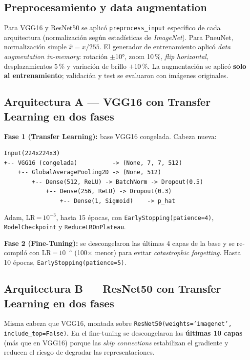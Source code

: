 \documentclass[1p,12pt]{elsarticle}
\begin{document}
\subsection{Preprocesamiento y data augmentation}

Para VGG16 y ResNet50 se aplicó \texttt{preprocess\_input} específico de cada arquitectura (normalización según estadísticas de \textit{ImageNet}). Para PneuNet, normalización simple $\hat{x} = x/255$. El generador de entrenamiento aplicó \textit{data augmentation in-memory}: rotación $\pm$10°, zoom 10\,\%, \textit{flip horizontal}, desplazamientos 5\,\% y variación de brillo $\pm$10\,\%. La augmentación se aplicó \textbf{solo al entrenamiento}; validación y test se evaluaron con imágenes originales.

\subsection{Arquitectura A — VGG16 con Transfer Learning en dos fases}

\textbf{Fase 1 (Transfer Learning):} base VGG16 congelada. Cabeza nueva:

\begin{lstlisting}
Input(224x224x3)
+-- VGG16 (congelada)          -> (None, 7, 7, 512)
    +-- GlobalAveragePooling2D -> (None, 512)
        +-- Dense(512, ReLU) -> BatchNorm -> Dropout(0.5)
            +-- Dense(256, ReLU) -> Dropout(0.3)
                +-- Dense(1, Sigmoid)    -> p_hat
\end{lstlisting}

Adam, LR\,=\,$10^{-3}$, hasta 15 épocas, con \texttt{EarlyStopping(patience=4)}, \texttt{ModelCheckpoint} y \texttt{ReduceLROnPlateau}.

\textbf{Fase 2 (Fine-Tuning):} se descongelaron las últimas 4 capas de la base y se re-compiló con LR\,=\,$10^{-5}$ (100$\times$ menor) para evitar \textit{catastrophic forgetting}. Hasta 10 épocas, \texttt{EarlyStopping(patience=5)}.

\subsection{Arquitectura B — ResNet50 con Transfer Learning en dos fases}

Misma cabeza que VGG16, montada sobre \texttt{ResNet50(weights='imagenet', include\_top=False)}. En el fine-tuning se descongelaron las \textbf{últimas 10 capas} (más que en VGG16) porque las \textit{skip connections} estabilizan el gradiente y reducen el riesgo de degradar las representaciones.
\end{document}
